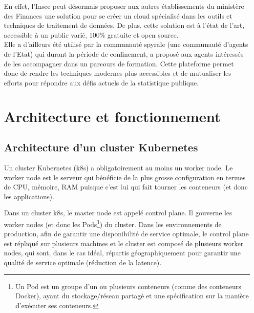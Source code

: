 \documentclass[11pt,fleqn]{book} %
\begin{document}
En effet, l'Insee peut désormais proposer aux autres établissements du ministère des Finances une solution pour se créer un cloud spécialisé dans les outils et techniques de traitement de données. De plus, cette solution est à l’état de l’art, accessible à un public varié, 100\% gratuite et open source.\\

Elle a d'ailleurs été utilisé par la communauté spyrale (une communauté d'agents de l'Etat) qui durant la période de confinement, a proposé aux agents intéressés de les accompagner dans un parcours de formation. Cette plateforme permet donc de rendre les techniques modernes plus accessibles et de mutualiser les efforts pour répondre aux défis actuels de la statistique publique.\\



\appendix


\chapter{Architecture et fonctionnement}
\vspace{-2cm}
\label{Architecture}

\section*{Architecture d'un cluster Kubernetes}
Un cluster Kubernetes (k8s) a obligatoirement au moins un worker node. Le worker node est le serveur qui bénéficie de la plus grosse configuration en termes de CPU, mémoire, RAM puisque c'est lui qui fait tourner les conteneurs (et donc les applications).\newline 

Dans un cluster k8s, le  master node est appelé control plane. Il gouverne les worker nodes (et donc les Pods\footnote{Un Pod est un groupe d'un ou plusieurs conteneurs (comme des conteneurs Docker), ayant du stockage/réseau partagé et une spécification sur la manière d'exécuter ses conteneurs.}) du cluster. Dans les environnements de production, afin de garantir une disponibilité de service optimale, le control plane est répliqué sur plusieurs machines et le cluster est composé de plusieurs worker nodes, qui sont, dans le cas idéal, répartis géographiquement pour garantir une qualité de service optimale (réduction de la latence).\newline
\end{document}
